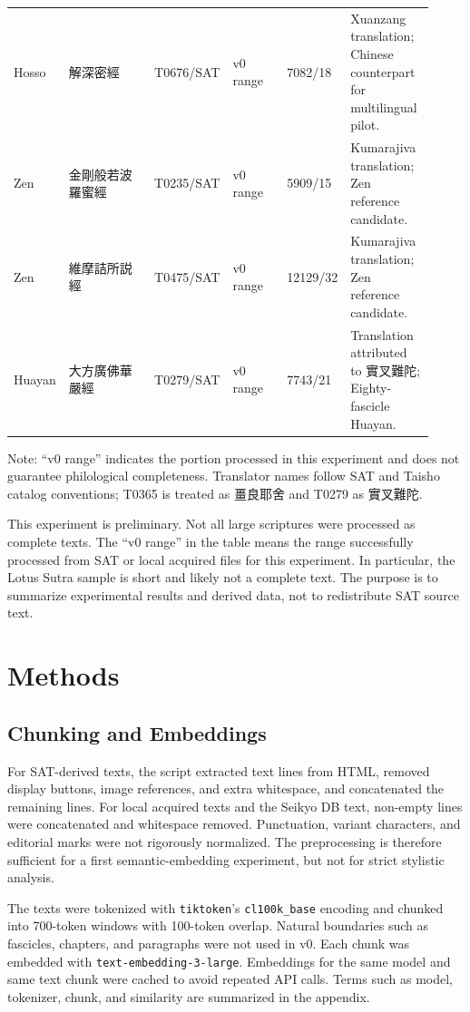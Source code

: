 \documentclass[uplatex,dvipdfmx,11pt,a4paper]{jsarticle}
\begin{document}
{\begin{longtable}{@{}p{0.11\linewidth}p{0.21\linewidth}p{0.15\linewidth}p{0.13\linewidth}p{0.12\linewidth}p{0.20\linewidth}@{}}
Hosso & 解深密經 & T0676/SAT & v0 range & 7082/18 & Xuanzang translation; Chinese counterpart for multilingual pilot. \\
Zen & 金剛般若波羅蜜經 & T0235/SAT & v0 range & 5909/15 & Kumarajiva translation; Zen reference candidate. \\
Zen & 維摩詰所説經 & T0475/SAT & v0 range & 12129/32 & Kumarajiva translation; Zen reference candidate. \\
Huayan & 大方廣佛華嚴經 & T0279/SAT & v0 range & 7743/21 & Translation attributed to 實叉難陀; Eighty-fascicle Huayan. \\
\bottomrule
\end{longtable}
}

{\footnotesize\noindent Note: ``v0 range'' indicates the portion processed in this experiment and does not guarantee philological completeness. Translator names follow SAT and Taisho catalog conventions; T0365 is treated as 畺良耶舍 and T0279 as 實叉難陀.\par}

This experiment is preliminary. Not all large scriptures were processed as complete texts. The ``v0 range'' in the table means the range successfully processed from SAT or local acquired files for this experiment. In particular, the Lotus Sutra sample is short and likely not a complete text. The purpose is to summarize experimental results and derived data, not to redistribute SAT source text.

\section{Methods}

\subsection{Chunking and Embeddings}

For SAT-derived texts, the script extracted text lines from HTML, removed display buttons, image references, and extra whitespace, and concatenated the remaining lines. For local acquired texts and the Seikyo DB text, non-empty lines were concatenated and whitespace removed. Punctuation, variant characters, and editorial marks were not rigorously normalized. The preprocessing is therefore sufficient for a first semantic-embedding experiment, but not for strict stylistic analysis.

The texts were tokenized with \texttt{tiktoken}'s \texttt{cl100k\_base} encoding and chunked into 700-token windows with 100-token overlap. Natural boundaries such as fascicles, chapters, and paragraphs were not used in v0. Each chunk was embedded with \texttt{text-embedding-3-large}. Embeddings for the same model and same text chunk were cached to avoid repeated API calls. Terms such as model, tokenizer, chunk, and similarity are summarized in the appendix.
\end{document}
